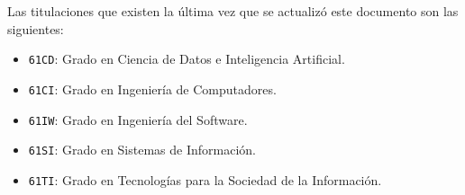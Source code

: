 Las titulaciones que existen la última vez que se actualizó este documento son las siguientes:

\begin{itemize}
    \item \texttt{61CD}: Grado en Ciencia de Datos e Inteligencia Artificial.
    \item \texttt{61CI}: Grado en Ingeniería de Computadores.
    \item \texttt{61IW}: Grado en Ingeniería del Software.
    \item \texttt{61SI}: Grado en Sistemas de Información.
    \item \texttt{61TI}: Grado en Tecnologías para la Sociedad de la Información.
\end{itemize}
